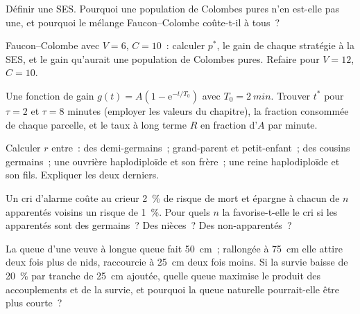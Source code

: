 \begin{exercise}[$\star$]\label{exo:b3:behavioural-ecology:4}
Définir une SES. Pourquoi une population de Colombes pures n'en est-elle
pas une, et pourquoi le mélange Faucon--Colombe coûte-t-il à tous~?
\end{exercise}

\begin{exercise}[$\star\star$]\label{exo:b3:behavioural-ecology:5}
Faucon--Colombe avec $V = 6$, $C = 10$~: calculer $p^{*}$, le gain de
chaque stratégie à la SES, et le gain qu'aurait une population de
Colombes pures. Refaire pour $V = 12$, $C = 10$.
\end{exercise}

\begin{exercise}[$\star\star$]\label{exo:b3:behavioural-ecology:6}
Une fonction de gain $g(t) = A(1 - \mathrm{e}^{-t/T_{0}})$ avec $T_{0} =
\qty{2}{min}$. Trouver $t^{*}$ pour $\tau = 2$ et $\tau = 8$ minutes
(employer les valeurs du chapitre), la fraction consommée de chaque
parcelle, et le taux à long terme $R$ en fraction d'$A$ par minute.
\end{exercise}

\begin{exercise}[$\star\star$]\label{exo:b3:behavioural-ecology:7}
Calculer $r$ entre~: des demi-germains~; grand-parent et petit-enfant~;
des cousins germains~; une ouvrière haplodiploïde et son frère~; une
reine haplodiploïde et son fils. Expliquer les deux derniers.
\end{exercise}

\begin{exercise}[$\star\star$]\label{exo:b3:behavioural-ecology:8}
Un cri d'alarme coûte au crieur \qty{2}{\%} de risque de mort et épargne
à chacun de $n$ apparentés voisins un risque de \qty{1}{\%}. Pour quels
$n$ la  favorise-t-elle le cri si les apparentés sont
des germains~? Des nièces~? Des non-apparentés~?
\end{exercise}

\begin{exercise}[$\star\star$]\label{exo:b3:behavioural-ecology:9}
La queue d'une veuve à longue queue fait \qty{50}{cm}~; rallongée à
\qty{75}{cm} elle attire deux fois plus de nids, raccourcie à
\qty{25}{cm} deux fois moins. Si la survie baisse de \qty{20}{\%} par
tranche de \qty{25}{cm} ajoutée, quelle queue maximise le produit des
accouplements et de la survie, et pourquoi la queue naturelle
pourrait-elle être plus courte~?
\end{exercise}

